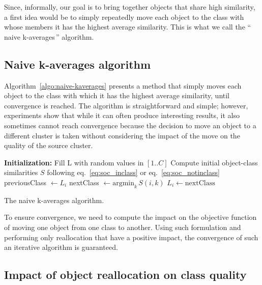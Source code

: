 \documentclass[natbib,smallextended]{svjour3}
\newcommand{\gl}[1]{``\,#1\,''} %
\begin{document}
Since, informally, our goal is to bring together objects that share high similarity, a first idea would be to simply repeatedly move each object to the class with whose members it has the highest average similarity. This is what we call the \gl{naive k-averages} algorithm.

\subsection{Naive k-averages algorithm}

Algorithm~\ref{algo:naive-kaverages} presents a method that simply moves each object to the class with which it has the highest average similarity, until convergence is reached. The algorithm is straightforward and simple; however, experiments show that while it can often produce interesting results, it also sometimes cannot reach convergence because the decision to move an object to a different cluster is taken without considering the impact of the move on the quality of the source cluster.

\begin{algorithm}
	\label{algo:naive-kaverages}
	\SetAlgoLined
	\BlankLine
	\textbf{Initialization:}
		Fill L with random values in $[1..C]$\;
		Compute initial object-class similarities $S$ following eq.~\ref{eq:soc_inclass} or eq.~\ref{eq:soc_notinclass}\;
	\BlankLine
	 {
		 {
			previousClass $\leftarrow L_i$\;
			nextClass $\leftarrow \mathrm{argmin}_k\, S(i, k)$
			 {
				$L_i \leftarrow \mathrm{nextClass}$\;
			}
		}
	}
	\BlankLine
	\caption{The naive k-averages algorithm.}
\end{algorithm}

To ensure convergence, we need to compute the impact on the objective function of moving one object from one class to another. Using such formulation and performing only reallocation that have a positive impact, the convergence of such an iterative algorithm is guaranteed.

\subsection{Impact of object reallocation on class quality}
\end{document}
